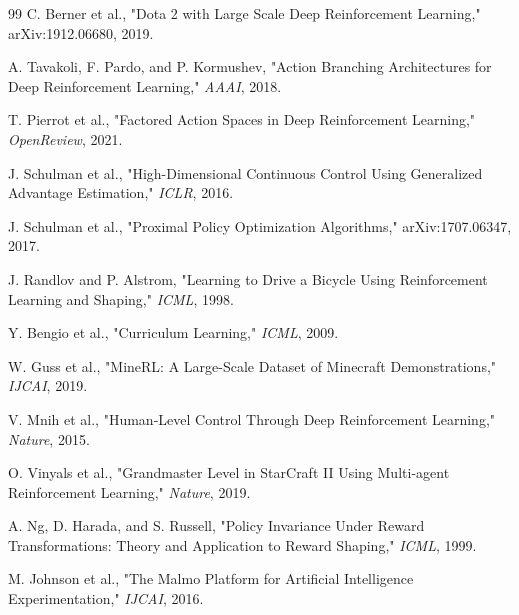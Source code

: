 \documentclass[conference]{IEEEtran}
\begin{document}

\begin{thebibliography}{99}
C. Berner et al., "Dota 2 with Large Scale Deep Reinforcement Learning," arXiv:1912.06680, 2019.

A. Tavakoli, F. Pardo, and P. Kormushev, "Action Branching Architectures for Deep Reinforcement Learning," \textit{AAAI}, 2018.

T. Pierrot et al., "Factored Action Spaces in Deep Reinforcement Learning," \textit{OpenReview}, 2021.

J. Schulman et al., "High-Dimensional Continuous Control Using Generalized Advantage Estimation," \textit{ICLR}, 2016.

J. Schulman et al., "Proximal Policy Optimization Algorithms," arXiv:1707.06347, 2017.

J. Randlov and P. Alstrom, "Learning to Drive a Bicycle Using Reinforcement Learning and Shaping," \textit{ICML}, 1998.

Y. Bengio et al., "Curriculum Learning," \textit{ICML}, 2009.

W. Guss et al., "MineRL: A Large-Scale Dataset of Minecraft Demonstrations," \textit{IJCAI}, 2019.

V. Mnih et al., "Human-Level Control Through Deep Reinforcement Learning," \textit{Nature}, 2015.

O. Vinyals et al., "Grandmaster Level in StarCraft II Using Multi-agent Reinforcement Learning," \textit{Nature}, 2019.

A. Ng, D. Harada, and S. Russell, "Policy Invariance Under Reward Transformations: Theory and Application to Reward Shaping," \textit{ICML}, 1999.

M. Johnson et al., "The Malmo Platform for Artificial Intelligence Experimentation," \textit{IJCAI}, 2016.

\end{thebibliography}
\end{document}
